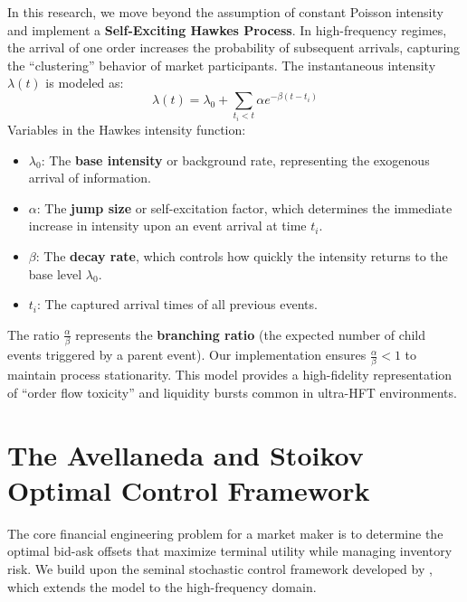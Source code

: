 In this research, we move beyond the assumption of constant Poisson intensity and implement a \textbf{Self-Exciting Hawkes Process}. In high-frequency regimes, the arrival of one order increases the probability of subsequent arrivals, capturing the ``clustering'' behavior of market participants. The instantaneous intensity $\lambda(t)$ is modeled as:
\begin{equation}
    \lambda(t) = \lambda_0 + \sum_{t_i < t} \alpha e^{-\beta(t - t_i)}
\end{equation}
Variables in the Hawkes intensity function:
\begin{itemize}
    \item $\lambda_0$: The \textbf{base intensity} or background rate, representing the exogenous arrival of information.
    \item $\alpha$: The \textbf{jump size} or self-excitation factor, which determines the immediate increase in intensity upon an event arrival at time $t_i$.
    \item $\beta$: The \textbf{decay rate}, which controls how quickly the intensity returns to the base level $\lambda_0$.
    \item $t_i$: The captured arrival times of all previous events.
\end{itemize}
The ratio $\frac{\alpha}{\beta}$ represents the \textbf{branching ratio} (the expected number of child events triggered by a parent event). Our implementation ensures $\frac{\alpha}{\beta} < 1$ to maintain process stationarity. This model provides a high-fidelity representation of ``order flow toxicity'' and liquidity bursts common in ultra-HFT environments.

\section{The Avellaneda and Stoikov Optimal Control Framework}
The core financial engineering problem for a market maker is to determine the optimal bid-ask offsets that maximize terminal utility while managing inventory risk. We build upon the seminal stochastic control framework developed by \citet{Avellaneda2008}, which extends the \citet{Ho1981} model to the high-frequency domain.

